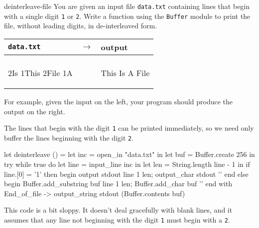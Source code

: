 %
\begin{exercise}{deinterleave-file}
You are given an input file \hbox{\lstinline+data.txt+} containing
lines that begin with a single digit \hbox{\lstinline+1+}
or \hbox{\lstinline+2+}.  Write a function using
the \hbox{\lstinline+Buffer+} module to print the file, without
leading digits, in de-interleaved form.

\begin{center}
\begin{tabular}{lcl}
\hbox{\lstinline+data.txt+} & $\longrightarrow$ & output\\
\hline\\
\begin{minipage}{2in}
\begin{ocamllisting}
2Is
1This
2File
1A
\end{ocamllisting}
\end{minipage}
&
&
\begin{minipage}{2in}
\begin{ocamllisting}
This
Is
A
File
\end{ocamllisting}
\end{minipage}
\end{tabular}
\end{center}
%
For example, given the input on the left, your program should produce
the output on the right.

\begin{answer}\ifanswers
The lines that begin with the digit \hbox{\lstinline+1+} can be
printed immediately, so we need only buffer the lines beginning with
the digit \hbox{\lstinline+2+}.

\begin{ocaml}
let deinterleave () =
   let inc = open_in "data.txt" in
   let buf = Buffer.create 256 in
   try
      while true do
         let line = input_line inc in
         let len = String.length line - 1 in
         if line.[0] = '1' then begin
            output stdout line 1 len;
            output_char stdout '\n'
         end
         else begin
            Buffer.add_substring buf line 1 len;
            Buffer.add_char buf '\n'
         end
   with End_of_file ->
      output_string stdout (Buffer.contents buf)
\end{ocaml}
%
This code is a bit sloppy.  It doesn't deal gracefully with blank
lines, and it assumes that any line not beginning with the
digit \hbox{\lstinline+1+} must begin with a \hbox{\lstinline+2+}.
\fi\end{answer}
\end{exercise}

